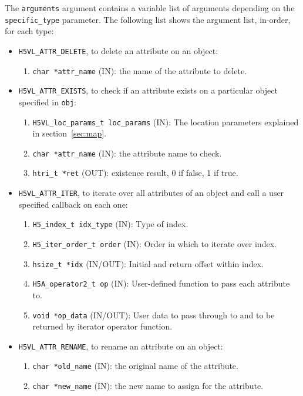 The {\tt arguments} argument contains a variable list of arguments
depending on the {\tt specific\_type} parameter. The following list shows
the argument list, in-order, for each type:

\begin{itemize}
\item {\tt H5VL\_ATTR\_DELETE}, to delete an attribute on an object:
  \begin{enumerate}
  \item {\tt char *attr\_name} (IN): the name of the attribute to delete.
  \end{enumerate}

\item {\tt H5VL\_ATTR\_EXISTS}, to check if an attribute exists on a
  particular object specified in {\tt obj}:
  \begin{enumerate}
  \item {\tt H5VL\_loc\_params\_t loc\_params} (IN): The location parameters
    explained in section~\ref{sec:map}.
  \item {\tt char *attr\_name} (IN): the attribute name to check.
  \item {\tt htri\_t *ret} (OUT): existence result, 0 if false, 1 if true.
  \end{enumerate}

\item {\tt H5VL\_ATTR\_ITER}, to iterate over all attributes of an object and call a user specified callback on each one:
  \begin{enumerate}
  \item {\tt H5\_index\_t idx\_type} (IN): Type of index.\\
  \item {\tt H5\_iter\_order\_t order} (IN): Order in which to iterate over index.\\
  \item {\tt hsize\_t *idx} (IN/OUT): Initial and return offset within index.\\
  \item {\tt H5A\_operator2\_t op} (IN): User-defined function to pass each attribute to. \\
  \item {\tt void *op\_data} (IN/OUT): User data to pass through to and to be returned by iterator operator function. \\
  \end{enumerate}

\item {\tt H5VL\_ATTR\_RENAME}, to rename an attribute on an object:
  \begin{enumerate}
  \item {\tt char *old\_name} (IN): the original name of the attribute.
  \item {\tt char *new\_name} (IN): the new name to assign for the attribute.
  \end{enumerate}

\end{itemize}

